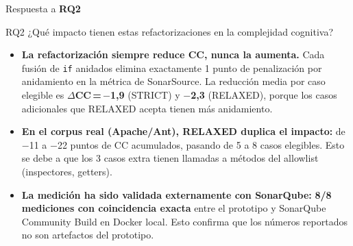 \documentclass[aspectratio=169, 10pt]{beamer}
\newcommand{\ok}[1]{\textcolor{okgreen}{\textbf{#1}}}
\newcommand{\rq}[1]{\textbf{RQ#1}}
\begin{document}
\begin{frame}{Respuesta a \rq{2}}
  \begin{block}{RQ2}
    ¿Qué impacto tienen estas refactorizaciones en la complejidad cognitiva?
  \end{block}

  \vspace{0.4em}
  \begin{itemize}
    \item \textbf{La refactorización siempre reduce CC, nunca la aumenta.}
          Cada fusión de \texttt{if} anidados elimina exactamente 1 punto de
          penalización por anidamiento en la métrica de SonarSource.
          La reducción media por caso elegible es \ok{$\Delta$CC\,=\,$-$1,9}
          (STRICT) y \ok{$-$2,3} (RELAXED), porque los casos adicionales
          que RELAXED acepta tienen más anidamiento.

    \item \textbf{En el corpus real (Apache/Ant), RELAXED duplica el impacto:}
          de $-$11 a $-$22 puntos de CC acumulados, pasando de 5 a 8 casos
          elegibles. Esto se debe a que los 3 casos extra tienen
          llamadas a métodos del allowlist (inspectores, getters).

    \item \textbf{La medición ha sido validada externamente con SonarQube:}
          \ok{8/8 mediciones con coincidencia exacta} entre el prototipo y
          SonarQube Community Build en Docker local. Esto confirma que los
          números reportados no son artefactos del prototipo.
  \end{itemize}
\end{frame}
\end{document}
